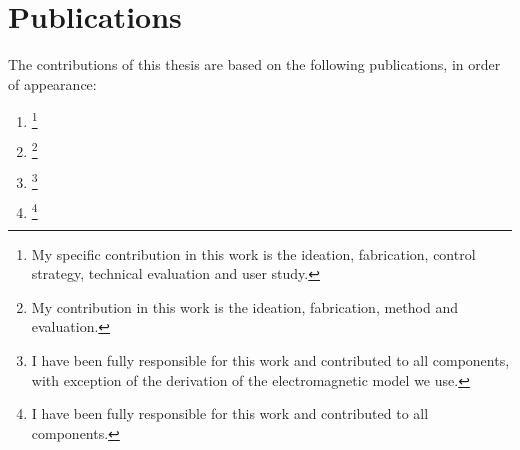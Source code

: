 \section{Publications}

\noindent
The contributions of this thesis are based on the following publications, in order of appearance:


\begin{enumerate}
    \item \begin{refsection}\end{refsection}
    \footnote{My specific contribution in this work is the ideation, fabrication, control strategy, technical evaluation and user study.}
    \item \begin{refsection} \end{refsection}
    \footnote{My contribution in this work is the ideation, fabrication, method and evaluation.}
    \item \begin{refsection}\end{refsection}
    \footnote{I have been fully responsible for this work and contributed to all components, with exception of the derivation of the electromagnetic model we use.}
    \item \begin{refsection}\end{refsection}
    \footnote{I have been fully responsible for this work and contributed to all components.}
    

\end{enumerate}

